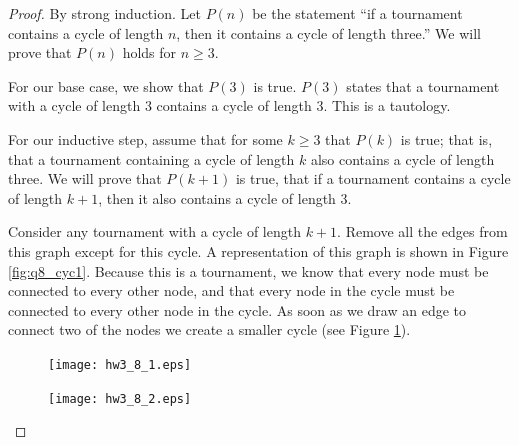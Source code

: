 \documentclass[10pt,letter]{article}
\begin{document}
\begin{proof} By strong induction. Let $P(n)$ be the statement ``if a tournament contains a cycle of length $n$, then it contains a cycle of length three.'' We will prove that $P(n)$ holds for $n \ge 3$. 

For our base case, we show that $P(3)$ is true. $P(3)$ states that a tournament with a cycle of length 3 contains a cycle of length 3. This is a tautology. 

For our inductive step, assume that for some $k \ge 3$ that $P(k)$ is true; that is, that a tournament containing a cycle of length $k$ also contains a cycle of length three. We will prove that $P(k+1)$ is true, that if a tournament contains a cycle of length $k+1$, then it also contains a cycle of length 3.

Consider any tournament with a cycle of length $k+1$. Remove all the edges from this graph except for this cycle. A representation of this graph is shown in Figure \ref{fig:q8_cyc1}. Because this is a tournament, we know that every node must be connected to every other node, and that every node in the cycle must be connected to every other node in the cycle. As soon as we draw an edge to connect two of the nodes we create a smaller cycle (see Figure \ref{fig:q8_cyc2}). 

\begin{figure}[h]
\centering
\begin{minipage}{.5\textwidth}
  \centering
  \texttt{[image: hw3\_8\_1.eps]}
  \label{fig:q8_cyc1}
\end{minipage}%
\begin{minipage}{.5\textwidth}
  \centering
  \texttt{[image: hw3\_8\_2.eps]}
  \label{fig:q8_cyc2}
\end{minipage}
\end{figure}

\end{proof}




\end{document}
